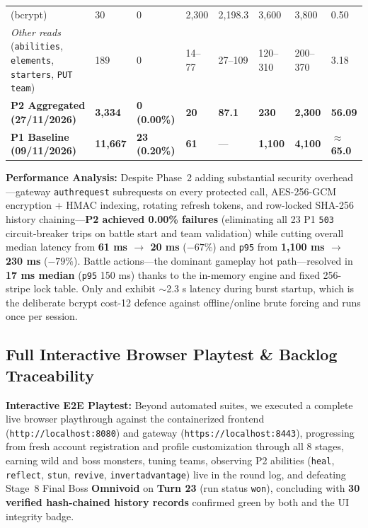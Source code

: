 \documentclass[10.5pt,a4paper]{article}
\DeclareRobustCommand{\code}[1]{\begingroup\def\_{\textunderscore\allowbreak}\texttt{#1}\endgroup}
\begin{document}
\begin{table}[H]
\begin{tabularx}{\linewidth}{@{}L{4.8cm}R{1.15cm}R{1.0cm}R{1.1cm}R{1.1cm}R{1.1cm}R{1.3cm}R{1.2cm}@{}}
 (bcrypt)     & 30    & 0 & 2,300 & 2,198.3 & 3,600 & 3,800 & 0.50  \\
\emph{Other reads} (\code{abilities}, \code{elements}, \code{starters}, \code{PUT team}) & 189 & 0 & 14–77 & 27–109 & 120–310 & 200–370 & 3.18 \\
\midrule
\textbf{P2 Aggregated (27/11/2026)}    & \textbf{3,334} & \textbf{0 (0.00\%)} & \textbf{20} & \textbf{87.1} & \textbf{230} & \textbf{2,300} & \textbf{56.09} \\
\textbf{P1 Baseline (09/11/2026)}      & \textbf{11,667} & \textbf{23 (0.20\%)} & \textbf{61} & — & \textbf{1,100} & \textbf{4,100} & \textbf{$\approx$65.0} \\
\bottomrule
\end{tabularx}
\end{table}

\textbf{Performance Analysis:} Despite Phase~2 adding substantial security overhead—gateway \code{auth\_request} subrequests on every protected call, AES-256-GCM encryption + HMAC indexing, rotating refresh tokens, and row-locked SHA-256 history chaining—\textbf{P2 achieved 0.00\% failures} (eliminating all 23 P1 \code{503} circuit-breaker trips on battle start and team validation) while cutting overall median latency from \textbf{61 ms $\to$ 20 ms} ($-67\%$) and \code{p95} from \textbf{1,100 ms $\to$ 230 ms} ($-79\%$). Battle actions—the dominant gameplay hot path—resolved in \textbf{17 ms median} (\code{p95} 150 ms) thanks to the in-memory engine and fixed 256-stripe lock table. Only  and  exhibit $\sim$2.3 s latency during burst startup, which is the deliberate bcrypt cost-12 defence against offline/online brute forcing and runs once per session.

\subsection{Full Interactive Browser Playtest \& Backlog Traceability}

\textbf{Interactive E2E Playtest:} Beyond automated suites, we executed a complete live browser playthrough against the containerized frontend (\code{http://localhost:8080}) and gateway (\code{https://localhost:8443}), progressing from fresh account registration and profile customization through all 8 stages, earning wild and boss monsters, tuning teams, observing P2 abilities (\code{heal}, \code{reflect}, \code{stun}, \code{revive}, \code{invert\_advantage}) live in the round log, and defeating Stage~8 Final Boss \textbf{Omnivoid} on \textbf{Turn 23} (run status \code{won}), concluding with \textbf{30 verified hash-chained history records} confirmed green by both  and the UI integrity badge.
\end{document}
